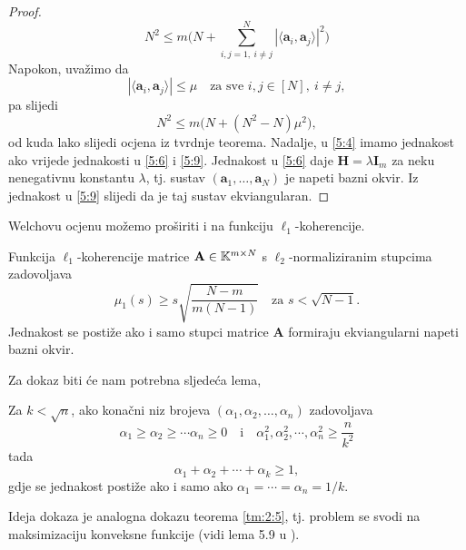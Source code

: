 \documentclass[a4paper,twoside,12pt]{memoir} %
\newcommand{\vect}[1]{\mathbf{#1}}
\renewcommand{\vec}{\vect}
\begin{document}
\begin{proof}
    \begin{equation}\label{5:8}
        N^2 \leq m \big( N + \sum_{i,j = 1,\ i \neq j}^N |\langle \vec a_i, \vec a_j \rangle|^2 \big)
    \end{equation}
    Napokon, uva\v{z}imo da 
    \begin{equation}\label{5:9}
        |\langle \vec a_i, \vec a_j \rangle| \leq \mu \quad \text{za sve }i,j \in [N],\ i \neq j,
    \end{equation}
    pa slijedi
    \begin{equation*}
        N^2 \leq m \big( N + (N^2 - N)\mu^2 \big), 
    \end{equation*}
    od kuda lako slijedi ocjena iz tvrdnje teorema.
    Nadalje, u \eqref{5:4} imamo jednakost ako vrijede jednakosti u \eqref{5:6} i \eqref{5:9}. Jednakost u \eqref{5:6} daje $\vec H = \lambda \vec I_m$ za neku nenegativnu konstantu $\lambda$, tj. sustav $(\vec a_1, \dots, \vec a_N)$ je napeti bazni okvir. Iz jednakost u \eqref{5:9} slijedi da je taj sustav ekviangularan.
\end{proof}

Welchovu ocjenu mo\v{z}emo pro\v{s}iriti i na funkciju $\ell_1$-koherencije.
\begin{thm}\label{tm:5:8}
    Funkcija $\ell_1$-koherencije matrice $\vec A \in \K^{m \times N}$ s $\ell_2$-normaliziranim stupcima zadovoljava 
    \begin{equation}\label{5:10}
        \mu_1(s) \geq s \sqrt{\frac{N-m}{m(N-1)}}\quad \text{za } s < \sqrt{N - 1}.
    \end{equation}
    Jednakost se posti\v{z}e ako i samo stupci matrice $\vec A$ formiraju ekviangularni napeti bazni okvir.
\end{thm}
Za dokaz biti \'ce nam potrebna sljede\'ca lema,
\begin{lem}\label{lem:5:9}
    Za $k < \sqrt{n}$, ako kona\v{c}ni niz brojeva $(\alpha_1, \alpha_2, \dots, \alpha_n)$ zadovoljava
    \begin{equation*}
        \alpha_1 \geq \alpha_2 \geq \cdots \alpha_n \geq 0 \quad \text{i} \quad \alpha_1^2,\alpha_2^2, \cdots,\alpha_n^2 \geq \frac{n}{k^2} 
    \end{equation*}
    tada
    \begin{equation*}
        \alpha_1 + \alpha_2 + \cdots + \alpha_k \geq 1, 
    \end{equation*}
    gdje se jednakost posti\v{z}e ako i samo ako $\alpha_1 = \cdots = \alpha_n = 1/k$.
\end{lem}
Ideja dokaza je analogna dokazu teorema \ref{tm:2:5}, tj. problem se svodi na maksimizaciju konveksne funkcije (vidi lema 5.9 u \cite{foucart13}).
\end{document}
